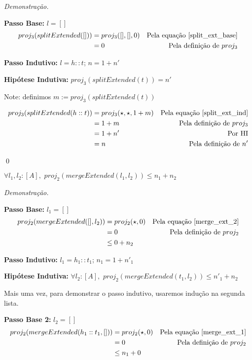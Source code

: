 \documentclass[12pt, oneside, a4paper,english,brazil]{abntex2}
\begin{document}
\noindent \textit{Demonstra\c{c}\~ao.}

\textbf{Passo Base: } $l = []$
\begin{align*}
  proj_{3}(splitExtended([])) &= proj_{3}([], [], 0) &\text{Pela equa\c{c}\~ao \ref{split_ext_base}} \\
  &= 0 &\text{Pela defini\c{c}\~ao de $proj_{3}$}
\end{align*}

\textbf{Passo Indutivo: } $l = h :: t$; $n = 1 + n'$

\textbf{Hip\'otese Indutiva: } $proj_{3}(splitExtended(t)) = n'$

Note: definimos $m := proj_{3}(splitExtended(t))$

\begin{align*}
  proj_{3}(splitExtended(h :: t)) &= proj_{3}(\star, \star, 1 + m) &\text{Pela equa\c{c}\~ao \ref{split_ext_ind}}\\
                                   &= 1 + m &\text{Pela defini\c{c}\~ao de $proj_{3}$}\\
                                   &= 1 + n' &\text{Por HI} \\
  &= n &\text{Pela defini\c{c}\~ao de $n'$}
\end{align*}


\qed

\begin{teorema} \label{merge_time}
  $\forall l_{1}, l_{2} : [A], \,\, proj_{2}(mergeExtended(l_{1}, l_{2})) \le n_{1} + n_{2}$
\end{teorema}

\noindent \textit{Demonstra\c{c}\~ao.}

\textbf{Passo Base: } $l_{1} = []$
\begin{align*}
  proj_{2}(mergeExtended([], l_{2})) &= proj_{2}(\star, 0) &\text{Pela equa\c{c}\~ao \ref{merge_ext_2}}\\
                                       &= 0 &\text{Pela defini\c{c}\~ao de $proj_{2}$} \\
  &\le 0 + n_{2}
\end{align*}

\textbf{Passo Indutivo: } $l_{1} = h_{1} :: t_{1}$; $n_{1} = 1 + n'_{1}$

\textbf{Hip\'otese Indutiva: } $\forall l_{2} : [A], \,\, proj_{2}(mergeExtended(t_{1}, l_{2})) \le n'_{1} + n_{2}$

Mais uma vez, para demonstrar o passo indutivo, usaremos indu\c{c}\~ao na segunda lista.

\textbf{Passo Base 2: } $l_{2} = []$
\begin{align*}
  proj_{2}(mergeExtended(h_{1} :: t_{1}, [])) &= proj_{2}(\star, 0) &\text{Pela equa\c{c}\~ao \ref{merge_ext_1}}\\
                                               &= 0 &\text{Pela defini\c{c}\~ao de $proj_{2}$} \\
  &\le n_{1} + 0
\end{align*}
\end{document}
